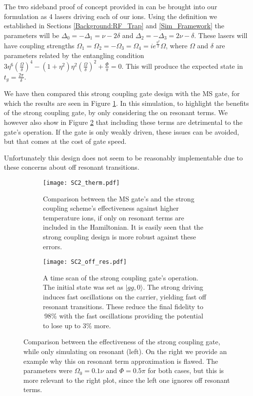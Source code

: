 \documentclass[12pt,twoside]{report}
\begin{document}
The two sideband proof of concept provided in \cite{SC_Paper} can be brought into our formulation as 4 lasers driving each of our ions. Using the definition we established in Sections \ref{Background:RF_Trap} and \ref{Sim_Framework} the parameters will be $\Delta_0 = -\Delta_1 = \nu - 2\delta$ and $\Delta_2 = -\Delta_3 = 2\nu-\delta$. These lasers will have coupling strengths ${\Omega_1 = \Omega_2 = -\Omega_3 = \Omega_4 = ie^{\frac{\eta^2}{2}}\Omega}$, where $\Omega$ and $\delta$ are parameters related by the entangling condition ${3\eta^6(\frac{\Omega}{\delta})^4 - (1 + \eta^2)\eta^2(\frac{\Omega}{\delta})^2 + \frac{\Phi}{\pi} = 0}$. This will produce the expected state in $t_g = \frac{2\pi}{\delta}$.

We have then compared this strong coupling gate design with the MS gate, for which the results are seen in Figure \ref{fig:sc2:comparison}. In this simulation, to highlight the benefits of the strong coupling gate, by only considering the on resonant terms. We however also show in Figure \ref{fig:sc2:time} that including these terms are detrimental to the gate's operation. If the gate is only weakly driven, these issues can be avoided, but that comes at the cost of gate speed.

Unfortunately this design does not seem to be reasonably implementable due to these concerns about off resonant transitions.

\begin{figure}[t!]
	\centering
	\begin{subfigure}[t]{0.475\textwidth}
		\centering
		\texttt{[image: SC2\_therm.pdf]}
		\caption{Comparison between the MS gate's and the strong coupling scheme's effectiveness against higher temperature ions, if only on resonant terms are included in the Hamiltonian. It is easily seen that the strong coupling design is more robust against these errors.}
		\label{fig:sc2:comparison}
	\end{subfigure}
	\hfill
	\begin{subfigure}[t]{0.475\textwidth}
		\centering
		\texttt{[image: SC2\_off\_res.pdf]}
		\caption{A time scan of the strong coupling gate's operation. The initial state was set as $|gg,0\rangle$. The strong driving induces fast oscillations on the carrier, yielding fast off resonant transitions. These reduce the final fidelity to $~98\%$ with the fast oscillations providing the potential to lose up to $3\%$ more.}
		\label{fig:sc2:time}
	\end{subfigure}
	\caption[Strong coupling design]{Comparison between the effectiveness of the strong coupling gate, while only simulating on resonant (left). On the right we provide an example why this on resonant term approximation is flawed. The parameters were $\Omega_0 = 0.1\nu$ and $\Phi=0.5\pi$ for both cases, but this is more relevant to the right plot, since the left one ignores off resonant terms.}
	\label{fig:sc2}
\end{figure}
\end{document}
